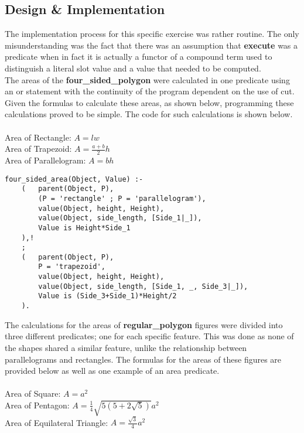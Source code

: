 \documentclass[11pt]{article}
\newcommand{\forceindent}{\leavevmode{\parindent=1em\indent}}
\begin{document}
\subsection{Design \& Implementation}
\forceindent The implementation process for this specific exercise was rather routine. The only misunderstanding was the fact that there was an assumption that \textbf{execute} was a predicate when in fact it is actually a functor of a compound term used to distinguish a literal slot value and a value that needed to be computed.\\
\forceindent The areas of the \textbf{four\_sided\_polygon} were calculated in one predicate using an or statement with the continuity of the program dependent on the use of cut. Given the formulas to calculate these areas, as shown below, programming these calculations proved to be simple. The code for such calculations is shown below.\\
\\
Area of Rectangle: $A = lw$ \\
Area of Trapezoid: $A = \displaystyle \frac{a+b}{2}h$\\ 
Area of Parallelogram: $A=bh$\\
\begin{lstlisting}
four_sided_area(Object, Value) :-
	( 	parent(Object, P), 
		(P = 'rectangle' ; P = 'parallelogram'),
		value(Object, height, Height),
		value(Object, side_length, [Side_1|_]),
		Value is Height*Side_1
	),!
	;
	( 	parent(Object, P), 
		P = 'trapezoid',
		value(Object, height, Height),
		value(Object, side_length, [Side_1, _, Side_3|_]),
		Value is (Side_3+Side_1)*Height/2
	).
\end{lstlisting}
\vspace{0.5cm}
\forceindent The calculations for the areas of \textbf{regular\_polygon} figures were divided into three different predicates; one for each specific feature. This was done as none of the shapes shared a similar feature, unlike the relationship between parallelograms and rectangles. The formulas for the areas of these figures are provided below as well as one example of an area predicate. \\
\\
Area of Square: $A = a^2$ \\
Area of Pentagon: $A = \displaystyle \frac{1}{4}\sqrt{5(5+2\sqrt{5})}a^2$\\ 
Area of Equilateral Triangle: $A=\displaystyle \frac{\sqrt{3}}{4}a^2$\\
\end{document}
